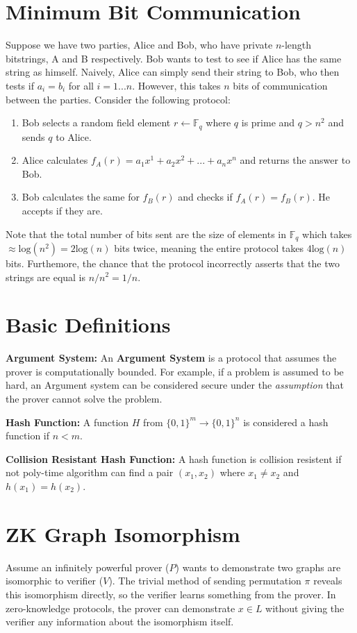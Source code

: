 \documentclass[11pt]{article}
\begin{document}
\section{Minimum Bit Communication}
Suppose we have two parties, Alice and Bob, who have private $n$-length bitstrings, A and B respectively. Bob wants to test to see if Alice has the same string as himself. Naively, Alice can simply send their string to Bob, who then tests if $a_i = b_i$ for all $i=1...n$. However, this takes $n$ bits of communication between the parties. Consider the following protocol:
\begin{enumerate}
\item Bob selects a random field element $r \leftarrow \mathbb{F}_q$ where $q$ is prime and $q > n^2$ and sends $q$ to Alice.
\item Alice calculates $f_A(r) = a_1 x^1 + a_2 x^2 + ... + a_n x^n$ and returns the answer to Bob.
\item Bob calculates the same for $f_B(r)$ and checks if $f_A(r) = f_B(r)$. He accepts if they are.
\end{enumerate}
Note that the total number of bits sent are the size of elements in $\mathbb{F}_q$ which takes $\approx \text{log}(n^2) = 2\text{log}(n)$ bits twice, meaning the entire protocol takes $4\text{log}(n)$ bits. Furthemore, the chance that the protocol incorrectly asserts that the two strings are equal is $n/n^2 = 1/n$.

\section{Basic Definitions}
\textbf{Argument System:} An \textbf{Argument System} is a protocol that assumes the prover is computationally bounded. For example, if a problem is assumed to be hard, an Argument system can be considered secure under the \textit{assumption} that the prover cannot solve the problem.
\vspace{1em}

\textbf{Hash Function:} A function $H$ from $\{0,1\}^m \rightarrow \{0,1\}^n$ is considered a hash function if $n < m$.

\textbf{Collision Resistant Hash Function:} A hash function is collision resistent if not poly-time algorithm can find a pair $(x_1,x_2)$ where $x_1 \neq x_2$ and $h(x_1) = h(x_2)$.

\section{ZK Graph Isomorphism}
Assume an infinitely powerful prover ($P$) wants to demonstrate two graphs are isomorphic to verifier ($V$). The trivial method of sending permutation $\pi$ reveals this isomorphism directly, so the verifier learns something from the prover. In zero-knowledge protocols, the prover can demonstrate $x \in L$ without giving the verifier any information about the isomorphism itself.
\vspace{1em}
\end{document}
